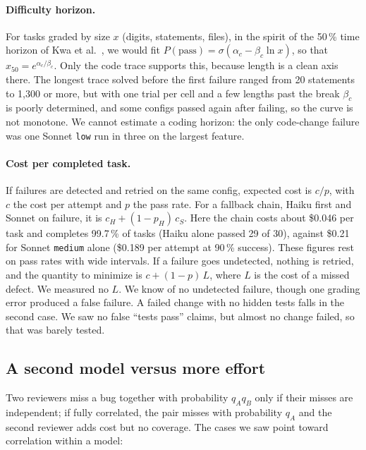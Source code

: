 \paragraph{Difficulty horizon.} For tasks graded by size $x$ (digits, statements, files), in the spirit of the 50\,\% time horizon of Kwa et al.~\cite{kwa2025longtasks}, we would fit $P(\mathrm{pass}) = \sigma(\alpha_c - \beta_c \ln x)$, so that $x_{50} = e^{\alpha_c / \beta_c}$. Only the code trace supports this, because length is a clean axis there. The longest trace solved before the first failure ranged from 20 statements to 1,300 or more, but with one trial per cell and a few lengths past the break $\beta_c$ is poorly determined, and some configs passed again after failing, so the curve is not monotone. We cannot estimate a coding horizon: the only code-change failure was one Sonnet \texttt{low} run in three on the largest feature.

\paragraph{Cost per completed task.} If failures are detected and retried on the same config, expected cost is $c/p$, with $c$ the cost per attempt and $p$ the pass rate. For a fallback chain, Haiku first and Sonnet on failure, it is $c_H + (1 - p_H)\,c_S$. Here the chain costs about \$0.046 per task and completes 99.7\,\% of tasks (Haiku alone passed 29 of 30), against \$0.21 for Sonnet \texttt{medium} alone (\$0.189 per attempt at 90\,\% success). These figures rest on pass rates with wide intervals. If a failure goes undetected, nothing is retried, and the quantity to minimize is $c + (1 - p)\,L$, where $L$ is the cost of a missed defect. We measured no $L$. We know of no undetected failure, though one grading error produced a false failure. A failed change with no hidden tests falls in the second case. We saw no false ``tests pass'' claims, but almost no change failed, so that was barely tested.

\subsection{A second model versus more effort}\label{sec:second-model}

Two reviewers miss a bug together with probability $q_A q_B$ only if their misses are independent; if fully correlated, the pair misses with probability $q_A$ and the second reviewer adds cost but no coverage. The cases we saw point toward correlation within a model:

